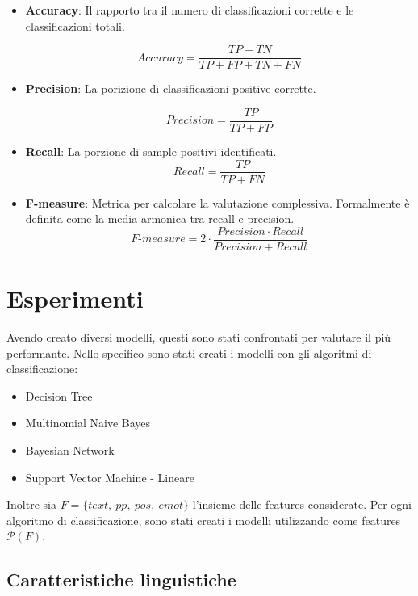 \documentclass[oneside]{book}
\begin{document}
\begin{itemize}
	\item \textbf{Accuracy}: Il rapporto tra il numero di classificazioni corrette e le classificazioni totali.
	
	$$Accuracy = \frac{TP + TN}{TP + FP + TN + FN} $$
	
	\item \textbf{Precision}: La porizione di classificazioni positive corrette.
	
	$$Precision = \frac{TP}{TP + FP} $$
		
	\item \textbf{Recall}: La porzione di sample positivi identificati.
	$$Recall = \frac{TP}{TP + FN} $$
	
	
	\item \textbf{F-measure}: Metrica per calcolare la valutazione complessiva. Formalmente è definita come la media armonica tra recall e precision.
	$$F\text{-}measure =  2 \cdot \frac{Precision \cdot Recall}{Precision + Recall} $$
	
\end{itemize}

\section{Esperimenti}
Avendo creato diversi modelli, questi sono stati confrontati per valutare il più performante. Nello specifico sono stati creati i modelli con gli algoritmi di classificazione:
\begin{itemize}
	\item Decision Tree
	\item Multinomial Naive Bayes
	\item Bayesian Network
	\item Support Vector Machine - Lineare
\end{itemize}
Inoltre sia $F = \{text,\ pp,\ pos,\ emot\}$ l'insieme delle features considerate. Per ogni algoritmo di classificazione, sono stati creati i modelli utilizzando come features $\mathscr{P}(F)$.

\newpage
\subsection{Caratteristiche linguistiche}
\end{document}
